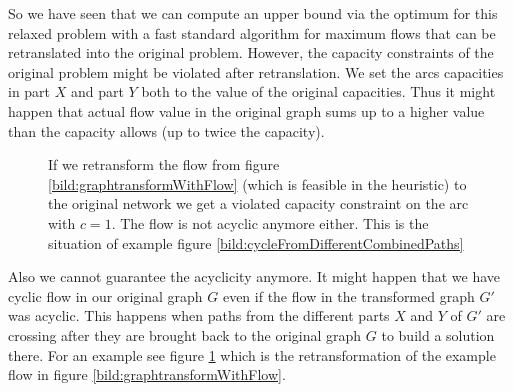 So we have seen that we can compute an upper bound via the optimum for this relaxed problem with a fast standard 
algorithm for maximum flows that can be retranslated into the original problem. 
However, the capacity constraints of the original problem might be violated after retranslation. We set the arcs 
capacities in part $X$ and part $Y$ both to the value of the original capacities. Thus it might happen that actual flow 
value in the original graph sums up to a higher value than the capacity allows (up to twice the capacity). 


\begin{figure}[h!]
\centering
{}
\caption{If we retransform the flow from figure \ref{bild:graphtransformWithFlow} (which is feasible in the heuristic) 
to the original network we get a violated capacity constraint on the arc with $c=1$. The flow is not acyclic anymore 
either. This is the situation of example figure \ref{bild:cycleFromDifferentCombinedPaths}}
 \label{bild:graphretransformWithFlow}
\end{figure}
Also we cannot guarantee the acyclicity anymore. It might happen that we have cyclic flow in our 
original graph $G$ even if the flow in the transformed graph $G'$ was acyclic. This happens when paths from 
the different parts $X$ and $Y$ of $G'$ are crossing after they are brought back to the original graph $G$ to 
build a solution there. For an example see figure \ref{bild:graphretransformWithFlow} which is the retransformation of 
the example flow in figure \ref{bild:graphtransformWithFlow}.